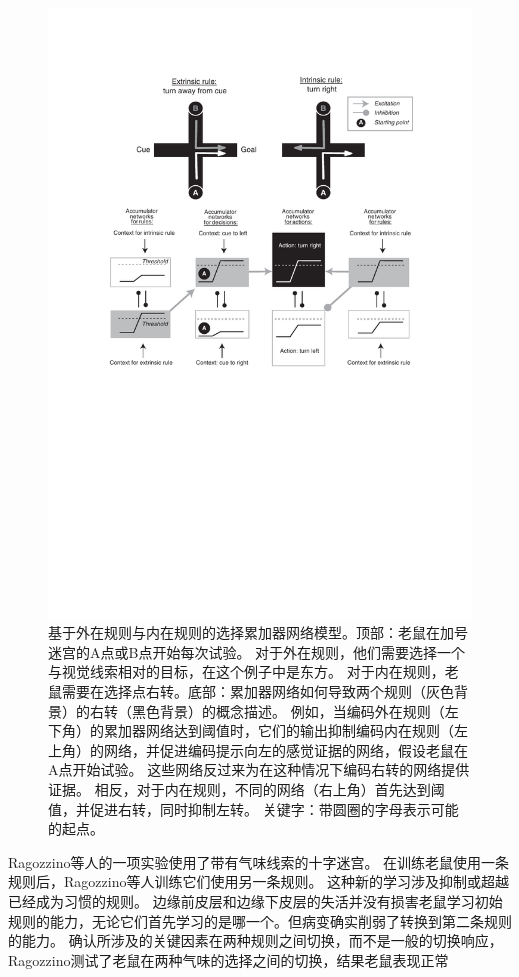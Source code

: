 \begin{figure}[!htb]
	\centering
	\includegraphics{chap3/3_6}
	\caption{基于外在规则与内在规则的选择累加器网络模型。顶部：老鼠在加号迷宫的A点或B点开始每次试验。
		对于外在规则，他们需要选择一个与视觉线索相对的目标，在这个例子中是东方。
		对于内在规则，老鼠需要在选择点右转。底部：累加器网络如何导致两个规则（灰色背景）的右转（黑色背景）的概念描述。
		例如，当编码外在规则（左下角）的累加器网络达到阈值时，它们的输出抑制编码内在规则（左上角）的网络，并促进编码提示向左的感觉证据的网络，假设老鼠在A点开始试验。
		这些网络反过来为在这种情况下编码右转的网络提供证据。
		相反，对于内在规则，不同的网络（右上角）首先达到阈值，并促进右转，同时抑制左转。
		关键字：带圆圈的字母表示可能的起点。}
	\label{fig:3_6}
\end{figure}


Ragozzino等人\cite{ragozzino1999involvement}的一项实验使用了带有气味线索的十字迷宫。
在训练老鼠使用一条规则后，Ragozzino等人训练它们使用另一条规则。
这种新的学习涉及抑制或超越已经成为习惯的规则。
边缘前皮层和边缘下皮层的失活并没有损害老鼠学习初始规则的能力，无论它们首先学习的是哪一个。但病变确实削弱了转换到第二条规则的能力。
确认所涉及的关键因素在两种规则之间切换，而不是一般的切换响应，Ragozzino\cite{ragozzino2007contribution}测试了老鼠在两种气味的选择之间的切换，结果老鼠表现正常\par


